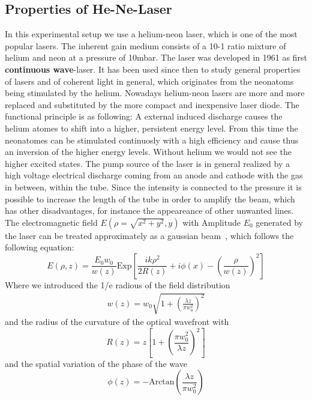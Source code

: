 \subsection{Properties of He-Ne-Laser}
In this experimental setup we use a helium-neon laser, which is one of the most popular lasers.
The inherent gain medium consists of a 10-1 ratio mixture of helium and neon 
at a pressure of 10mbar. The laser
was developed in 1961 as first \textbf{continuous wave}-laser. It has been used since then to
study general properties of lasers and of coherent light in general, which originates from
the neonatoms being stimulated by the helium. Nowadays helium-neon lasers are more and more
replaced and substituted by the more compact and inexpensive laser diode.
The functional principle is as following: A external induced discharge causes the helium atomes
to shift into a higher, persistent energy level. From this time the neonatomes can be stimulated
continuosly with a high efficiency and cause thus an inversion of the higher energy levels.
Without helium we would not see the higher excited states. The pump source of the laser
is in general realized by a high voltage electrical discharge coming from an anode and
cathode with the gas in between, within the tube. Since the intensity is connected to the
pressure it is possible to increase the length of the tube in order to amplify the beam, which
has other disadvantages, for instance the appeareance of other unwanted lines.
The electromagnetic field $E(\rho = \sqrt{x^2 + y^2}, y)$ with Amplitude $E_0$ 
generated by the laser can be treated approximately as a gaussian
beam~\cite{boyd2003nonlinear}, which follows the following equation:
\begin{equation}
    E(\rho,z) = \frac{E_0 w_0}{w(z)} \mathrm{Exp} \left[  
        \frac{ik\rho^2}{2R(z)} + i\phi(x) - \left( \frac{\rho}{w(z)} \right)^2    \right]
\end{equation}
Where we introduced the 1/e radious of the field distribution
\begin{align}
    w(z) = w_0 \sqrt{ 1 +\left (\frac{\lambda z}{\pi w_0^2} \right )^2}
\end{align}
and the radius of the curvature of the optical wavefront with
\begin{equation}
    R(z) = z \left[ 1 + \left( \frac{\pi w_0^2}{\lambda z} \right)^2 \right]
\end{equation}
and the spatial variation of the phase of the wave
\begin{equation}
    \phi(z) = - \mathrm{Arctan} \left( \frac{\lambda z}{\pi w_0^2} \right) 
\end{equation}


